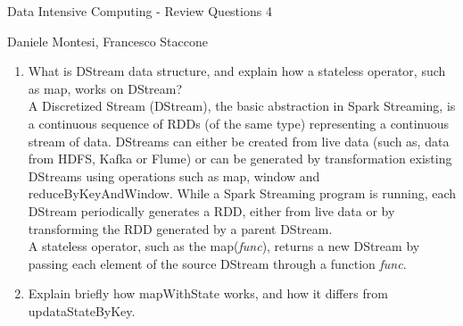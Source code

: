 \documentclass[]{report}
\begin{document}
\begin{center}
 {\Large Data Intensive Computing - Review Questions 4}
\end{center}
\begin{center}
 {\small Daniele Montesi, Francesco Staccone}
\end{center}
\vspace{1cm}
\justify
\begin{enumerate}
 \item What is DStream data structure, and explain how a stateless operator, such as map, works on DStream?\\
 
 A Discretized Stream (DStream), the basic abstraction in Spark Streaming, is a continuous sequence of RDDs (of the same type) representing a continuous stream of data. DStreams can either be created from live data (such as, data from HDFS, Kafka or Flume) or can be generated by transformation existing DStreams using operations such as map, window and reduceByKeyAndWindow. While a Spark Streaming program is running, each DStream periodically generates a RDD, either from live data or by transforming the RDD generated by a parent DStream.\\
 A stateless operator, such as the map(\textit{func}), returns a new DStream by passing each element of the source DStream through a function \textit{func}.
 
 \item Explain briefly how mapWithState works, and how it differs from updataStateByKey.\\
 

\end{enumerate}
\end{document}
